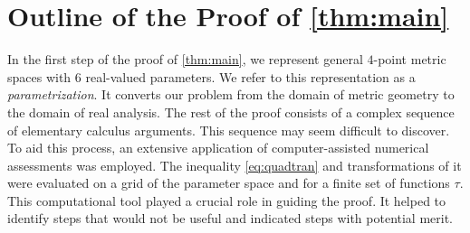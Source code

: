 \documentclass{article}
\newcommand{\tran}{\tau}
\begin{document}
\section{Outline of the Proof of \cref{thm:main}}\label{sec:proofoutline}
%
In the first step of the proof of \cref{thm:main}, we represent general $4$-point metric spaces with $6$ real-valued parameters. We refer to this representation as a \textit{parametrization}. It converts our problem from the domain of metric geometry to the domain of real analysis. The rest of the proof consists of a complex sequence of elementary calculus arguments. This sequence may seem difficult to discover. To aid this process, an extensive application of computer-assisted numerical assessments was employed. The inequality \eqref{eq:quadtran} and transformations of it were evaluated on a grid of the parameter space and for a finite set of functions $\tran$. This computational tool played a crucial role in guiding the proof. It helped to identify steps that would not be useful and indicated steps with potential merit. 
%
%
%
\end{document}

